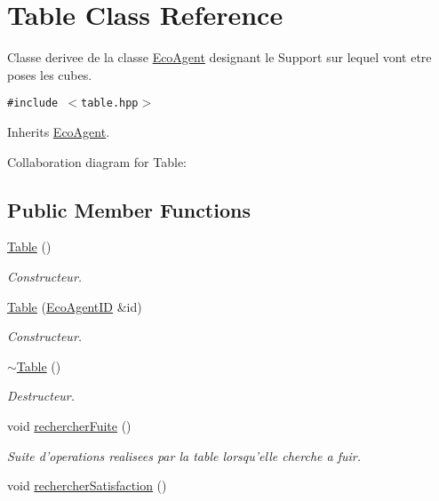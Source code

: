 \hypertarget{classTable}{
\section{Table Class Reference}
\label{classTable}
}
Classe derivee de la classe \hyperlink{classEcoAgent}{EcoAgent} designant le Support sur lequel vont etre poses les cubes.  


{\tt \#include $<$table.hpp$>$}

Inherits \hyperlink{classEcoAgent}{EcoAgent}.

Collaboration diagram for Table:\subsection*{Public Member Functions}
\begin{CompactItemize}
\item 
\hyperlink{classTable_049f2e06391781ae255c6698869c4ad1}{Table} ()
\begin{CompactList}\small\item\em Constructeur. \item\end{CompactList}\item 
\hyperlink{classTable_f82a6d490aa166537ac2e42e83ec8cd3}{Table} (\hyperlink{classEcoAgentID}{EcoAgentID} \&id)
\begin{CompactList}\small\item\em Constructeur. \item\end{CompactList}\item 
\hyperlink{classTable_9a559f2e7beb37b511ee9f88873164f8}{$\sim$Table} ()
\begin{CompactList}\small\item\em Destructeur. \item\end{CompactList}\item 
\hypertarget{classTable_e5da6b33fc4bfa706559b50668b3e5b4}{
void \hyperlink{classTable_e5da6b33fc4bfa706559b50668b3e5b4}{rechercherFuite} ()}
\label{classTable_e5da6b33fc4bfa706559b50668b3e5b4}

\begin{CompactList}\small\item\em Suite d'operations realisees par la table lorsqu'elle cherche a fuir. \item\end{CompactList}\item 
\hypertarget{classTable_3fc58e0af8f075440c9184f674e1d02e}{
void \hyperlink{classTable_3fc58e0af8f075440c9184f674e1d02e}{rechercherSatisfaction} ()}
\label{classTable_3fc58e0af8f075440c9184f674e1d02e}


\end{CompactItemize}
